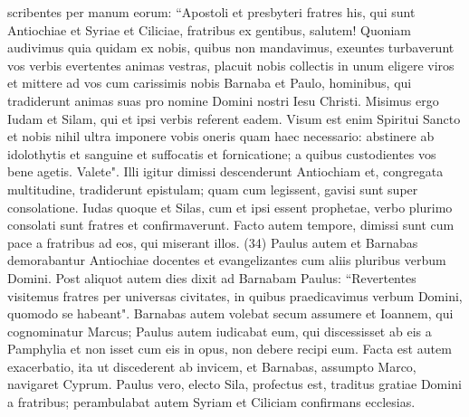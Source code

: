 \begin{biblechapter}
\verse scribentes per manum eorum: “Apostoli et presbyteri fratres his, qui sunt Antiochiae et Syriae et Ciliciae, fratribus ex gentibus, salutem! 
\verse Quoniam audivimus quia quidam ex nobis, quibus non mandavimus, exeuntes turbaverunt vos verbis evertentes animas vestras, 
\verse placuit nobis collectis in unum eligere viros et mittere ad vos cum carissimis nobis Barnaba et Paulo, 
\verse hominibus, qui tradiderunt animas suas pro nomine Domini nostri Iesu Christi. 
\verse Misimus ergo Iudam et Silam, qui et ipsi verbis referent eadem. 
\verse Visum est enim Spiritui Sancto et nobis nihil ultra imponere vobis oneris quam haec necessario: 
\verse abstinere ab idolothytis et sanguine et suffocatis et fornicatione; a quibus custodientes vos bene agetis. Valete". 
\verse Illi igitur dimissi descenderunt Antiochiam et, congregata multitudine, tradiderunt epistulam; 
\verse quam cum legissent, gavisi sunt super consolatione. 
\verse Iudas quoque et Silas, cum et ipsi essent prophetae, verbo plurimo consolati sunt fratres et confirmaverunt. 
\verse Facto autem tempore, dimissi sunt cum pace a fratribus ad eos, qui miserant illos. (34) 
\verse Paulus autem et Barnabas demorabantur Antiochiae docentes et evangelizantes cum aliis pluribus verbum Domini. 
\verse Post aliquot autem dies dixit ad Barnabam Paulus: “Revertentes visitemus fratres per universas civitates, in quibus praedicavimus verbum Domini, quomodo se habeant". 
\verse Barnabas autem volebat secum assumere et Ioannem, qui cognominatur Marcus; 
\verse Paulus autem iudicabat eum, qui discessisset ab eis a Pamphylia et non isset cum eis in opus, non debere recipi eum. 
\verse Facta est autem exacerbatio, ita ut discederent ab invicem, et Barnabas, assumpto Marco, navigaret Cyprum. 
\verse Paulus vero, electo Sila, profectus est, traditus gratiae Domini a fratribus; 
\verse perambulabat autem Syriam et Ciliciam confirmans ecclesias. 
\end{biblechapter}

